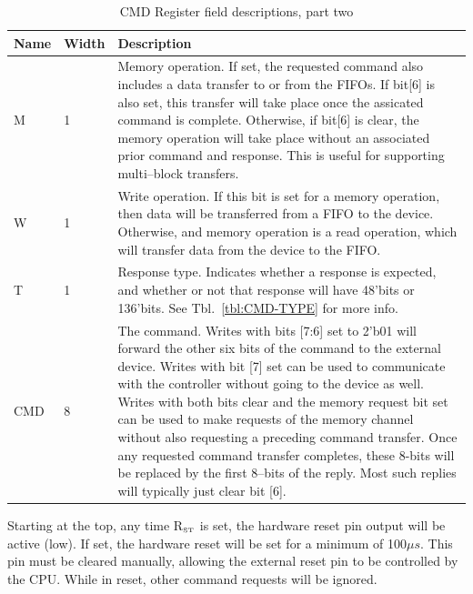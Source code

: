 \documentclass{gqtekspec}
\begin{document}
\begin{table}\begin{center}
\begin{tabular}{|p{1.2in}|p{0.5in}|p{4.0in}|}\hline
	\rowcolor[gray]{0.85} Name & Width & Description\\\hline\hline
M & 1 & Memory operation.  If set, the requested command also includes a data
	transfer to or from the FIFOs.  If bit[6] is also set, this transfer
	will take place once the assicated command is complete.  Otherwise, if
	bit[6] is clear, the memory operation will take place without an
	associated prior command and response.  This is useful for supporting
	multi--block transfers. \\
W & 1 & Write operation.  If this bit is set for a memory operation, then
	data will be transferred from a FIFO to the device.  Otherwise, and
	memory operation is a read operation, which will transfer data from
	the device to the FIFO.\\
T & 1 & Response type.  Indicates whether a response is expected, and
	whether or not that response will have 48'bits or 136'bits.
	See Tbl.~\ref{tbl:CMD-TYPE} for more info.\\
CMD & 8 & The command.  Writes with bits [7:6] set to 2'b01 will forward
	the other six bits of the command to the external device.  Writes with
	bit [7] set can be used to communicate with the controller without
	going to the device as well.  Writes with both bits clear and the
	memory request bit set can be used to make requests of the memory
	channel without also requesting a preceding command transfer.  Once
	any requested command transfer completes, these 8-bits will be
	replaced by the first 8--bits of the reply.  Most such replies will
	typically just clear bit [6].
	\\\hline
\end{tabular}
\caption{CMD Register field descriptions, part two}\label{tbl:CMD2}
\end{center}\end{table}

Starting at the top, any time R$_{\mbox{\tiny ST}}$ is set, the hardware
reset pin output will be active (low).  If set, the hardware reset will be set
for a minimum of 100$\mu s$.  This pin must be cleared manually, allowing
the external reset pin to be controlled by the CPU.  While in reset, other
command requests will be ignored.
\end{document}
